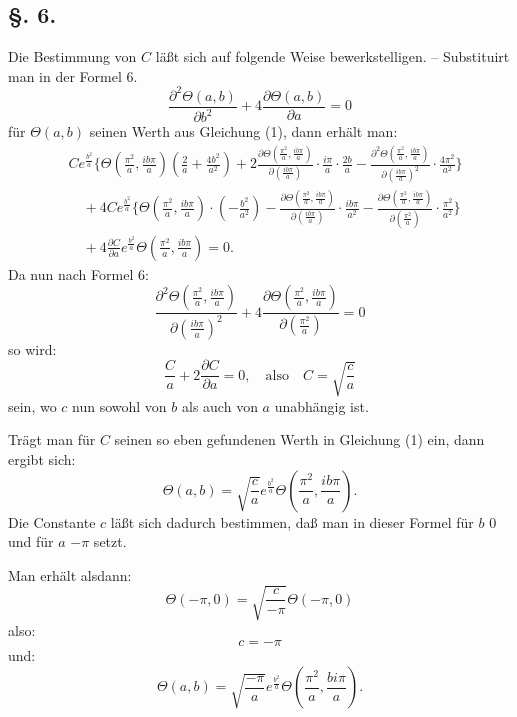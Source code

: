 \documentclass[10pt]{article}
\newcommand{\dd}{\partial}
\newcommand{\sourceanchor}[1]{\hypertarget{source-#1}{}}
\begin{document}
\subsection*{\S. 6.}
Die Bestimmung von \(C\) läßt sich auf folgende Weise bewerkstelligen. -- Substituirt man in der Formel 6.
\[
\frac{\dd^{2}\Theta(a,b)}{\dd b^{2}}+4\frac{\dd\Theta(a,b)}{\dd a}=0
\]
für \(\Theta(a,b)\) seinen Werth aus Gleichung (1), dann erhält man:
\begin{align*}
& C e^{\frac{b^{2}}{a}}\Biggl\{\Theta\!\left(\frac{\pi^{2}}{a},\frac{ib\pi}{a}\right)\!\left(\frac{2}{a}+\frac{4b^{2}}{a^{2}}\right)
 +2\frac{\dd\Theta\!\left(\frac{\pi^{2}}{a},\frac{ib\pi}{a}\right)}{\dd\left(\frac{ib\pi}{a}\right)}\cdot\frac{i\pi}{a}\cdot\frac{2b}{a}
 -\frac{\dd^{2}\Theta\!\left(\frac{\pi^{2}}{a},\frac{ib\pi}{a}\right)}{\dd\left(\frac{ib\pi}{a}\right)^{2}}\cdot\frac{4\pi^{2}}{a^{2}}\Biggr\}\\
&\quad +4C e^{\frac{b^{2}}{a}}\Biggl\{\Theta\!\left(\frac{\pi^{2}}{a},\frac{ib\pi}{a}\right)\cdot\left(-\frac{b^{2}}{a^{2}}\right)
-\frac{\dd\Theta\!\left(\frac{\pi^{2}}{a},\frac{ib\pi}{a}\right)}{\dd\left(\frac{ib\pi}{a}\right)}\cdot\frac{ib\pi}{a^{2}}
-\frac{\dd\Theta\!\left(\frac{\pi^{2}}{a},\frac{ib\pi}{a}\right)}{\dd\left(\frac{\pi^{2}}{a}\right)}\cdot\frac{\pi^{2}}{a^{2}}\Biggr\}\\
&\quad +4\frac{\dd C}{\dd a}e^{\frac{b^{2}}{a}}\Theta\!\left(\frac{\pi^{2}}{a},\frac{ib\pi}{a}\right)=0.
\end{align*}
Da nun nach Formel 6:
\[
\frac{\dd^{2}\Theta\!\left(\frac{\pi^{2}}{a},\frac{ib\pi}{a}\right)}{\dd\left(\frac{ib\pi}{a}\right)^{2}}+4\frac{\dd\Theta\!\left(\frac{\pi^{2}}{a},\frac{ib\pi}{a}\right)}{\dd\left(\frac{\pi^{2}}{a}\right)}=0
\]
so wird:
\[
\frac{C}{a}+2\frac{\dd C}{\dd a}=0,
\quad\text{also}\quad
C=\sqrt{\frac{c}{a}}
\]
sein, wo \(c\) nun sowohl von \(b\) als auch von \(a\) unabhängig ist.

\sourceanchor{PA07}
Trägt man für \(C\) seinen so eben gefundenen Werth in Gleichung (1) ein, dann ergibt sich:
\[
\Theta(a,b)=\sqrt{\frac{c}{a}}e^{\frac{b^{2}}{a}}\Theta\!\left(\frac{\pi^{2}}{a},\frac{ib\pi}{a}\right).
\]
Die Constante \(c\) läßt sich dadurch bestimmen, daß man in dieser Formel für \(b\) 0 und für \(a\) \(-\pi\) setzt.

Man erhält alsdann:
\[
\Theta(-\pi,0)=\sqrt{\frac{c}{-\pi}}\Theta(-\pi,0)
\]
also:
\[
c=-\pi
\]
und:
\begin{equation*}
\Theta(a,b)=\sqrt{\frac{-\pi}{a}}e^{\frac{b^{2}}{a}}\Theta\!\left(\frac{\pi^{2}}{a},\frac{bi\pi}{a}\right).
\tag{7.}
\end{equation*}
\end{document}

